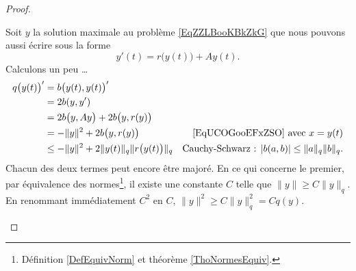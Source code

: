 \begin{proof}
\begin{subproof}
    Soit \( y\) la solution maximale au problème \eqref{EqZZLBooKBkZkG} que nous pouvons aussi écrire sous la forme
    \begin{equation}
        y'(t)=r\big( y(t) \big)+Ay(t).
    \end{equation}
    Calculons un peu \ldots
    \begin{subequations}    \label{subeqsZCOLooOzTBLr}
        \begin{align}
            q\big( y(t) \big)'&=b\big( y(t),y(t) \big)'\\
            &=2b(y,y')\\
            &=2b\big( y,Ay \big)+2b\big( y,r(y) \big)\\
            &=-\| y \|^2+2b\big( y,r(y) \big)       &\text{\eqref{EqUCOGooEFxZSO} avec } x=y(t)\\
            &\leq -\| y \|^2+2\| y(t) \|_q\| r\big( y(t) \big) \|_q &\text{Cauchy-Schwarz : } | b(a,b) |\leq \| a \|_q\| b \|_q\text{.}
        \end{align}
    \end{subequations}
    Chacun des deux termes peut encore être majoré. En ce qui concerne le premier, par équivalence des normes\footnote{Définition \ref{DefEquivNorm} et théorème \ref{ThoNormesEquiv}.}, il existe une constante \( C\) telle que \( \| y \|\geq C \| y \|_q\). En renommant immédiatement $C^2$ en \( C\), \( \| y \|^2\geq C\| y \|_q^2=Cq(y)\).


\end{subproof}
\end{proof}
